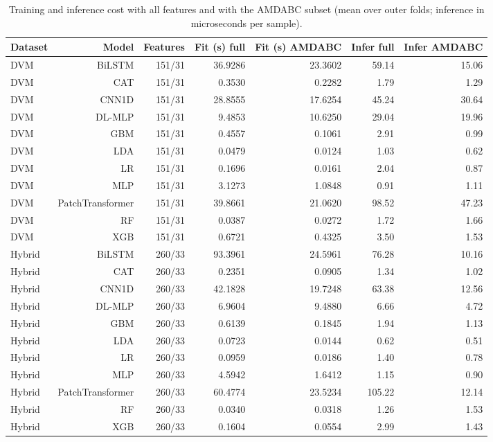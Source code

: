 \begin{table}[htbp]
\centering\small
\caption{Training and inference cost with all features and with the AMDABC subset (mean over outer folds; inference in microseconds per sample).}\label{tab:efficiency}
\begin{tabular}{lrrrrrr}
\hline
Dataset & Model & Features & Fit (s) full & Fit (s) AMDABC & Infer full & Infer AMDABC \\ \hline
DVM & BiLSTM & 151/31 & 36.9286 & 23.3602 & 59.14 & 15.06 \\
DVM & CAT & 151/31 & 0.3530 & 0.2282 & 1.79 & 1.29 \\
DVM & CNN1D & 151/31 & 28.8555 & 17.6254 & 45.24 & 30.64 \\
DVM & DL-MLP & 151/31 & 9.4853 & 10.6250 & 29.04 & 19.96 \\
DVM & GBM & 151/31 & 0.4557 & 0.1061 & 2.91 & 0.99 \\
DVM & LDA & 151/31 & 0.0479 & 0.0124 & 1.03 & 0.62 \\
DVM & LR & 151/31 & 0.1696 & 0.0161 & 2.04 & 0.87 \\
DVM & MLP & 151/31 & 3.1273 & 1.0848 & 0.91 & 1.11 \\
DVM & PatchTransformer & 151/31 & 39.8661 & 21.0620 & 98.52 & 47.23 \\
DVM & RF & 151/31 & 0.0387 & 0.0272 & 1.72 & 1.66 \\
DVM & XGB & 151/31 & 0.6721 & 0.4325 & 3.50 & 1.53 \\
Hybrid & BiLSTM & 260/33 & 93.3961 & 24.5961 & 76.28 & 10.16 \\
Hybrid & CAT & 260/33 & 0.2351 & 0.0905 & 1.34 & 1.02 \\
Hybrid & CNN1D & 260/33 & 42.1828 & 19.7248 & 63.38 & 12.56 \\
Hybrid & DL-MLP & 260/33 & 6.9604 & 9.4880 & 6.66 & 4.72 \\
Hybrid & GBM & 260/33 & 0.6139 & 0.1845 & 1.94 & 1.13 \\
Hybrid & LDA & 260/33 & 0.0723 & 0.0144 & 0.62 & 0.51 \\
Hybrid & LR & 260/33 & 0.0959 & 0.0186 & 1.40 & 0.78 \\
Hybrid & MLP & 260/33 & 4.5942 & 1.6412 & 1.15 & 0.90 \\
Hybrid & PatchTransformer & 260/33 & 60.4774 & 23.5234 & 105.22 & 12.14 \\
Hybrid & RF & 260/33 & 0.0340 & 0.0318 & 1.26 & 1.53 \\
Hybrid & XGB & 260/33 & 0.1604 & 0.0554 & 2.99 & 1.43 \\

\end{tabular}
\end{table}
